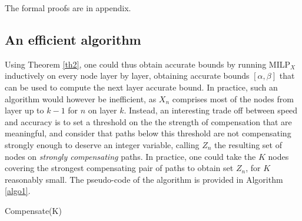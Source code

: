 \documentclass{llncs}
\begin{document}
The formal proofs are in appendix.


\subsection{An efficient algorithm}

Using Theorem \ref{th2}, one could thus obtain accurate bounds by running MILP$_{X}$ inductively on every node layer by layer, obtaining accurate bounds $[\alpha,\beta]$ that can be used to compute the next layer accurate bound. In practice, such an algorithm would however be inefficient, as $X_n$ comprises most of the nodes from layer up to $k-1$ for $n$ on layer $k$. Instead, an interesting trade off between speed and accuracy is to set a threshold on the the strength of compensation that are meaningful, and consider that paths below this threshold are not compensating strongly enough to deserve an integer variable, calling $Z_n$ the resulting set of nodes on {\em strongly compensating} paths. In practice, one could take the $K$ nodes covering the strongest compensating pair of paths to obtain set $Z_n$, for $K$ reasonably small. The pseudo-code of the algorithm is provided in Algorithm \ref{algo1}.

	
\begin{algorithm}[b!]
	\caption{Compensate(K)}
	\label{algo1}
	
	 
	 \end{algorithm}	
	
	
	
\end{document}
